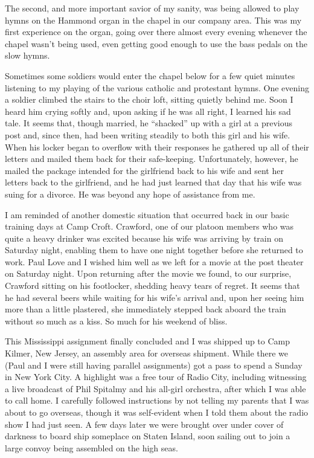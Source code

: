The second, and more important savior of my sanity, was being allowed to play hymns on the Hammond organ in the chapel in our company area. This was my first experience on the organ, going over there almost every evening whenever the chapel wasn't being used, even getting good enough to use the bass pedals on the slow hymns.

Sometimes some soldiers would enter the chapel below for a few quiet minutes listening to my playing of the various catholic and protestant hymns. One evening a soldier climbed the stairs to the choir loft, sitting quietly behind me. Soon I heard him crying softly and, upon asking if he was all right, I learned his sad tale. It seems that, though married, he ``shacked'' up with a girl at a previous post and, since then, had been writing steadily to both this girl and his wife. When his locker began to overflow with their responses he gathered up all of their letters and mailed them back for their safe-keeping. Unfortunately, however, he mailed the package intended for the girlfriend back to his wife and sent her letters back to the girlfriend, and he had just learned that day that his wife was suing for a divorce. He was beyond any hope of assistance from me.

I am reminded of another domestic situation that occurred back in our basic training days at Camp Croft. Crawford, one of our platoon members who was quite a heavy drinker was excited because his wife was arriving by train on Saturday night, enabling them to have one night together before she returned to work. Paul Love and I wished him well as we left for a movie at the post theater on Saturday night. Upon returning after the movie we found, to our surprise, Crawford sitting on his footlocker, shedding heavy tears of regret. It seems that he had several beers while waiting for his wife's arrival and, upon her seeing him more than a little plastered, she immediately stepped back aboard the train without so much as a kiss. So much for his weekend of bliss.

This Mississippi assignment finally concluded and I was shipped up to Camp Kilmer, New Jersey, an assembly area for overseas shipment. While there we (Paul and I were still having parallel assignments) got a pass to spend a Sunday in New York City. A highlight was a free tour of Radio City, including witnessing a live broadcast of Phil Spitalmy and his all-girl orchestra, after which I was able to call home. I carefully followed instructions by not telling my parents that I was about to go overseas, though it was self-evident when I told them about the radio show I had just seen. A few days later we were brought over under cover of darkness to board ship someplace on Staten Island, soon sailing out to join a large convoy being assembled on the high seas.

